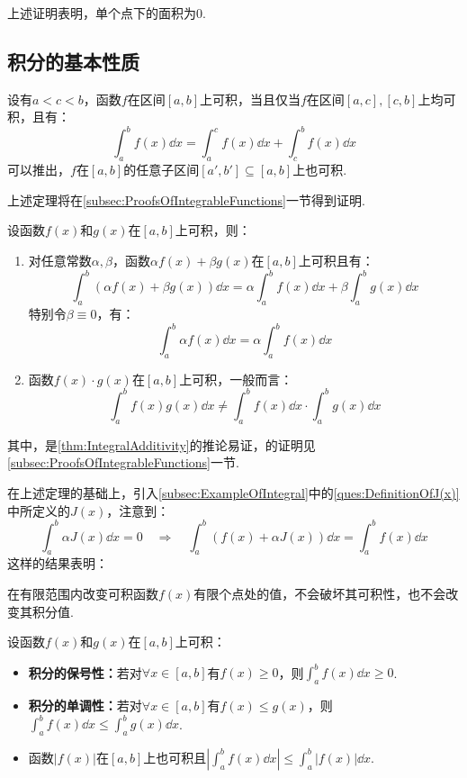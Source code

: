上述证明表明，单个点下的面积为$0$.


\subsection{积分的基本性质}
\begin{theorem}
    \label{thm:IntegralAdditivity}
    设有$a<c<b$，函数$f$在区间$[a,b]$上可积，当且仅当$f$在区间$[a,c],[c,b]$上均可积，且有：
    \[\int_{a}^{b}f(x)\dd{x} = \int_{a}^{c}f(x)\dd{x} + \int_{c}^{b}f(x)\dd{x}\]
    可以推出，$f$在$[a,b]$的任意子区间$[a',b'] \subseteq [a,b]$上也可积.
\end{theorem}

上述定理将在\cref{subsec:ProofsOfIntegrableFunctions}一节得到证明.

\begin{theorem}
    \label{thm:ProductIntegrability}
    设函数$f(x)$和$g(x)$在$[a,b]$上可积，则：
    \begin{enumerate}[circ]
        \item 对任意常数$\alpha,\beta$，函数$\alpha f(x) + \beta g(x)$在$[a,b]$上可积且有：
        \[\int_{a}^{b}(\alpha f(x) + \beta g(x))\dd{x} = \alpha\int_{a}^{b}f(x)\dd{x} + \beta\int_{a}^{b}g(x)\dd{x}\]
        特别令$\beta \equiv 0$，有：
        \[\int_{a}^{b}\alpha f(x)\dd{x} = \alpha\int_{a}^{b}f(x)\dd{x}\]
        \item 函数$f(x)\cdot g(x)$在$[a,b]$上可积，一般而言：
        \[\int_{a}^{b}f(x)g(x)\dd{x} \neq \int_{a}^{b}f(x)\dd{x}\cdot\int_{a}^{b}g(x)\dd{x}\]
    \end{enumerate}
\end{theorem}
其中，是\cref{thm:IntegralAdditivity}的推论易证，的证明见\cref{subsec:ProofsOfIntegrableFunctions}一节.

在上述定理的基础上，引入\cref{subsec:ExampleOfIntegral}中的\cref{ques:DefinitionOfJ(x)}中所定义的$J(x)$，注意到：
\[\int_{a}^{b}\alpha J(x)\dd{x} = 0 \quad\Rightarrow\quad \int_{a}^{b}(f(x) + \alpha J(x))\dd{x} = \int_{a}^{b}f(x)\dd{x}\]
这样的结果表明：
\begin{theorem}
    \label{thm:FinitePointModificationInvariance}
    在有限范围内改变可积函数$f(x)$有限个点处的值，不会破坏其可积性，也不会改变其积分值.
\end{theorem}

\begin{theorem}
    设函数$f(x)$和$g(x)$在$[a,b]$上可积：
    \begin{itemize}
        \item \textbf{积分的保号性：}若对$\forall x \in [a,b]$有$f(x) \geqslant 0$，则$\displaystyle\int_{a}^{b}f(x)\dd{x}\geqslant 0$.
        \item \textbf{积分的单调性：}若对$\forall x \in [a,b]$有$f(x)\leqslant g(x)$，则$\displaystyle\int_{a}^{b}f(x)\dd{x} \leqslant \int_{a}^{b}g(x)\dd{x}$.
        \item 函数$|f(x)|$在$[a,b]$上也可积且$\displaystyle\left|\int_{a}^{b}f(x)\dd{x}\right|\leqslant\int_{a}^{b}|f(x)|\dd{x}$.
    \end{itemize}
\end{theorem}

